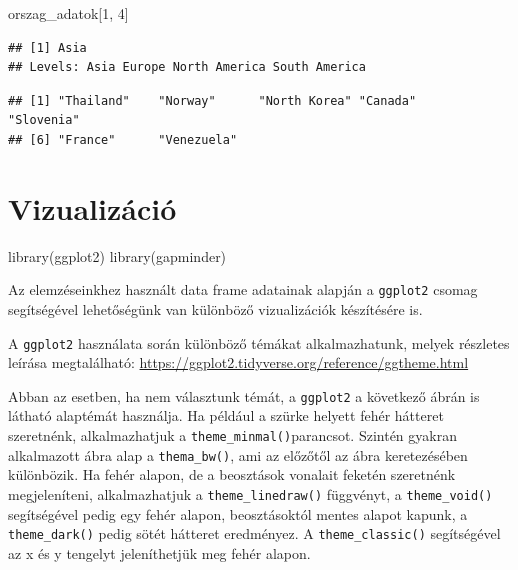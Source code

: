 \documentclass[
]{book}
\newenvironment{Shaded}{\begin{snugshade}}{\end{snugshade}}
\newcommand{\DecValTok}[1]{\textcolor[rgb]{0.00,0.00,0.81}{#1}}
\newcommand{\FunctionTok}[1]{\textcolor[rgb]{0.00,0.00,0.00}{#1}}
\newcommand{\NormalTok}[1]{#1}
\newcommand{\SpecialCharTok}[1]{\textcolor[rgb]{0.00,0.00,0.00}{#1}}
\begin{document}
\begin{Shaded}
\begin{Highlighting}[]
\NormalTok{orszag\_adatok[}\DecValTok{1}\NormalTok{, }\DecValTok{4}\NormalTok{]}
\end{Highlighting}
\end{Shaded}

\begin{verbatim}
## [1] Asia
## Levels: Asia Europe North America South America
\end{verbatim}

\begin{Shaded}
\end{Shaded}

\begin{verbatim}
## [1] "Thailand"    "Norway"      "North Korea" "Canada"      "Slovenia"   
## [6] "France"      "Venezuela"
\end{verbatim}

\hypertarget{vizualizuxe1ciuxf3}{%
\section{Vizualizáció}\label{vizualizuxe1ciuxf3}}

\begin{Shaded}
\begin{Highlighting}[]
\FunctionTok{library}\NormalTok{(ggplot2)}
\FunctionTok{library}\NormalTok{(gapminder)}
\end{Highlighting}
\end{Shaded}

Az elemzéseinkhez használt data frame adatainak alapján a
\texttt{ggplot2} csomag segítségével lehetőségünk van különböző
vizualizációk készítésére is.

A \texttt{ggplot2} használata során különböző témákat alkalmazhatunk,
melyek részletes leírása megtalálható:
\url{https://ggplot2.tidyverse.org/reference/ggtheme.html}

Abban az esetben, ha nem választunk témát, a \texttt{ggplot2} a
következő ábrán is látható alaptémát használja. Ha például a szürke
helyett fehér hátteret szeretnénk, alkalmazhatjuk a
\texttt{theme\_minmal()}parancsot. Szintén gyakran alkalmazott ábra alap
a \texttt{thema\_bw()}, ami az előzőtől az ábra keretezésében
különbözik. Ha fehér alapon, de a beosztások vonalait feketén szeretnénk
megjeleníteni, alkalmazhatjuk a \texttt{theme\_linedraw()} függvényt, a
\texttt{theme\_void()} segítségével pedig egy fehér alapon,
beosztásoktól mentes alapot kapunk, a \texttt{theme\_dark()} pedig sötét
hátteret eredményez. A \texttt{theme\_classic()} segítségével az x és y
tengelyt jeleníthetjük meg fehér alapon.
\end{document}
